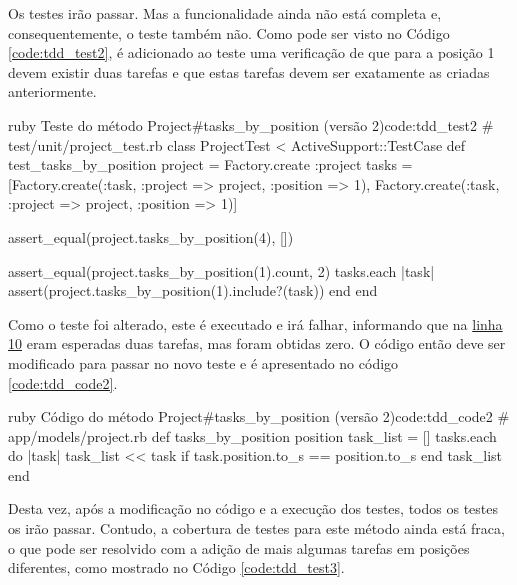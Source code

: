 Os testes irão passar. Mas a funcionalidade ainda não está completa e, consequentemente, o teste também não. Como pode ser visto no Código \ref{code:tdd_test2}, é adicionado ao teste uma verificação de que para a posição 1 devem existir duas tarefas e que estas tarefas devem ser exatamente as criadas anteriormente.

\begin{mycode}{ruby}%
{Teste do método Project\#tasks\_by\_position (versão 2)}{code:tdd_test2}
# test/unit/project_test.rb
class ProjectTest < ActiveSupport::TestCase
  def test_tasks_by_position
    project = Factory.create :project
    tasks = [Factory.create(:task, :project => project, :position => 1),
             Factory.create(:task, :project => project, :position => 1)]

    assert_equal(project.tasks_by_position(4), [])

    assert_equal(project.tasks_by_position(1).count, 2)
    tasks.each { |task| assert(project.tasks_by_position(1).include?(task)) }
  end
end
\end{mycode}

Como o teste foi alterado, este é executado e irá falhar, informando que na \hyperref[code:tdd_test2]{linha 10} eram esperadas duas tarefas, mas foram obtidas zero. O código então deve ser modificado para passar no novo teste e é apresentado no código \ref{code:tdd_code2}.

\begin{mycode}{ruby}%
{Código do método Project\#tasks\_by\_position (versão 2)}{code:tdd_code2}
# app/models/project.rb
def tasks_by_position position
  task_list = []
  tasks.each do |task|
    task_list << task if task.position.to_s == position.to_s
  end
  task_list
end
\end{mycode}

Desta vez, após a modificação no código e a execução dos testes, todos os testes os irão passar. Contudo, a cobertura de testes para este método ainda está fraca, o que pode ser resolvido com a adição de mais algumas tarefas em posições diferentes, como mostrado no Código \ref{code:tdd_test3}.

